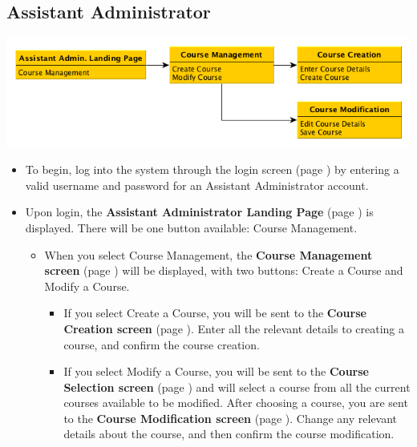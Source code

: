 \documentclass{article}
\begin{document}
\subsection{Assistant Administrator}
\centerline{\includegraphics[scale=.6]{../images/UIMockups/pngs/assistantAdmin}}
\begin{itemize}
  \item To begin, log into the system through the login screen (page \pageref{login})
    by entering a valid username and password for an Assistant Administrator 
    account.
  \item Upon login, the \textbf{Assistant Administrator Landing Page} (page
    \pageref{landPg}) is displayed. There will be one button available: Course
    Management.
    \begin{itemize}
    \item When you select Course Management, the \textbf{Course Management
      screen} (page \pageref{courseManage}) will be displayed, with two buttons: 
      Create a Course and Modify a Course.
      \begin{itemize}
      \item If you select Create a Course, you will be sent to the \textbf{Course
	Creation screen} (page \pageref{createCourse}). Enter all the relevant details to creating a course, and
	confirm the course creation.
      \item If you select Modify a Course, you will be sent to the \textbf{Course
	Selection screen} (page \pageref{courseSel}) and will select a course from all the current courses
	available to be modified. After choosing a course, you are sent to the
	\textbf{Course Modification screen} (page \pageref{courseManage}). Change any relevant details about
	the course, and then confirm the course modification.
      \end{itemize}
    \end{itemize}
\end{itemize}
\end{document}
